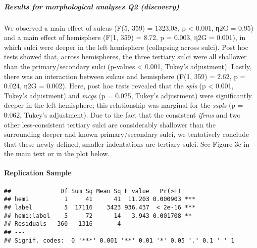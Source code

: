 \documentclass[
]{article}
\newenvironment{Shaded}{\begin{snugshade}}{\end{snugshade}}
\newcommand{\CommentTok}[1]{\textcolor[rgb]{0.56,0.35,0.01}{\textit{#1}}}
\newcommand{\DataTypeTok}[1]{\textcolor[rgb]{0.13,0.29,0.53}{#1}}
\newcommand{\KeywordTok}[1]{\textcolor[rgb]{0.13,0.29,0.53}{\textbf{#1}}}
\newcommand{\NormalTok}[1]{#1}
\newcommand{\OperatorTok}[1]{\textcolor[rgb]{0.81,0.36,0.00}{\textbf{#1}}}
\newcommand{\StringTok}[1]{\textcolor[rgb]{0.31,0.60,0.02}{#1}}
\begin{document}
\hypertarget{results-for-morphological-analyses-q2-discovery}{%
\subparagraph{Results for morphological analyses Q2
(discovery)}\label{results-for-morphological-analyses-q2-discovery}}

We observed a main effect of sulcus (F(5, 359) = 1323.08, p \textless{}
0.001, η2G = 0.95) and a main effect of hemisphere (F(1, 359) = 8.72, p
= 0.003, η2G = 0.001), in which sulci were deeper in the left hemisphere
(collapsing across sulci). Post hoc tests showed that, across
hemispheres, the three tertiary sulci were all shallower than the
primary/secondary sulci (p-values \textless{} 0.001, Tukey's
adjustment). Lastly, there was an interaction between sulcus and
hemisphere (F(1, 359) = 2.62, p = 0.024, η2G = 0.002). Here, post hoc
tests revealed that the \emph{spls} (p \textless{} 0.001, Tukey's
adjustment) and \emph{mcgs} (p = 0.025, Tukey's adjustment) were
significantly deeper in the left hemisphere; this relationship was
marginal for the \emph{sspls} (p = 0.062, Tukey's adjustment). Due to
the fact that the consistent \emph{ifrms} and two other less-consistent
tertiary sulci are considerably shallower than the surrounding deeper
and known primary/secondary sulci, we tentatively conclude that these
newly defined, smaller indentations are tertiary sulci. See Figure 3c in
the main text or in the plot below.

\hypertarget{replication-sample-1}{%
\paragraph{Replication Sample}\label{replication-sample-1}}

\begin{Shaded}
\end{Shaded}

\begin{verbatim}
##              Df Sum Sq Mean Sq F value   Pr(>F)    
## hemi          1     41      41  11.203 0.000903 ***
## label         5  17116    3423 936.437  < 2e-16 ***
## hemi:label    5     72      14   3.943 0.001708 ** 
## Residuals   360   1316       4                     
## ---
## Signif. codes:  0 '***' 0.001 '**' 0.01 '*' 0.05 '.' 0.1 ' ' 1
\end{verbatim}
\end{document}
